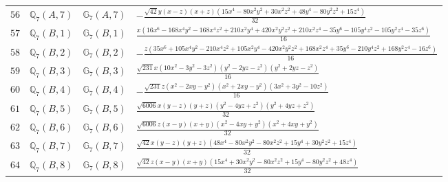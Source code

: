 \documentclass[fleqn,8pt,landscape]{jsarticle}
\begin{document}
\begin{table}[ht!]
\begin{center}
\begin{tabular}{cccl}
$ 56 $ & $ \mathbb{Q}_{7}(A,7) $ & $ \mathbb{G}_{7}(A,7) $ & $ - \frac{\sqrt{42} y \left(x - z\right) \left(x + z\right) \left(15 x^{4} - 80 x^{2} y^{2} + 30 x^{2} z^{2} + 48 y^{4} - 80 y^{2} z^{2} + 15 z^{4}\right)}{32} $ \\
$ 57 $ & $ \mathbb{Q}_{7}(B,1) $ & $ \mathbb{G}_{7}(B,1) $ & $ \frac{x \left(16 x^{6} - 168 x^{4} y^{2} - 168 x^{4} z^{2} + 210 x^{2} y^{4} + 420 x^{2} y^{2} z^{2} + 210 x^{2} z^{4} - 35 y^{6} - 105 y^{4} z^{2} - 105 y^{2} z^{4} - 35 z^{6}\right)}{16} $ \\
$ 58 $ & $ \mathbb{Q}_{7}(B,2) $ & $ \mathbb{G}_{7}(B,2) $ & $ - \frac{z \left(35 x^{6} + 105 x^{4} y^{2} - 210 x^{4} z^{2} + 105 x^{2} y^{4} - 420 x^{2} y^{2} z^{2} + 168 x^{2} z^{4} + 35 y^{6} - 210 y^{4} z^{2} + 168 y^{2} z^{4} - 16 z^{6}\right)}{16} $ \\
$ 59 $ & $ \mathbb{Q}_{7}(B,3) $ & $ \mathbb{G}_{7}(B,3) $ & $ \frac{\sqrt{231} x \left(10 x^{2} - 3 y^{2} - 3 z^{2}\right) \left(y^{2} - 2 y z - z^{2}\right) \left(y^{2} + 2 y z - z^{2}\right)}{16} $ \\
$ 60 $ & $ \mathbb{Q}_{7}(B,4) $ & $ \mathbb{G}_{7}(B,4) $ & $ - \frac{\sqrt{231} z \left(x^{2} - 2 x y - y^{2}\right) \left(x^{2} + 2 x y - y^{2}\right) \left(3 x^{2} + 3 y^{2} - 10 z^{2}\right)}{16} $ \\
$ 61 $ & $ \mathbb{Q}_{7}(B,5) $ & $ \mathbb{G}_{7}(B,5) $ & $ \frac{\sqrt{6006} x \left(y - z\right) \left(y + z\right) \left(y^{2} - 4 y z + z^{2}\right) \left(y^{2} + 4 y z + z^{2}\right)}{32} $ \\
$ 62 $ & $ \mathbb{Q}_{7}(B,6) $ & $ \mathbb{G}_{7}(B,6) $ & $ \frac{\sqrt{6006} z \left(x - y\right) \left(x + y\right) \left(x^{2} - 4 x y + y^{2}\right) \left(x^{2} + 4 x y + y^{2}\right)}{32} $ \\
$ 63 $ & $ \mathbb{Q}_{7}(B,7) $ & $ \mathbb{G}_{7}(B,7) $ & $ \frac{\sqrt{42} x \left(y - z\right) \left(y + z\right) \left(48 x^{4} - 80 x^{2} y^{2} - 80 x^{2} z^{2} + 15 y^{4} + 30 y^{2} z^{2} + 15 z^{4}\right)}{32} $ \\
$ 64 $ & $ \mathbb{Q}_{7}(B,8) $ & $ \mathbb{G}_{7}(B,8) $ & $ \frac{\sqrt{42} z \left(x - y\right) \left(x + y\right) \left(15 x^{4} + 30 x^{2} y^{2} - 80 x^{2} z^{2} + 15 y^{4} - 80 y^{2} z^{2} + 48 z^{4}\right)}{32} $ \\
 \hline \hline
\end{tabular}
\end{center}
\end{table}
\end{document}
